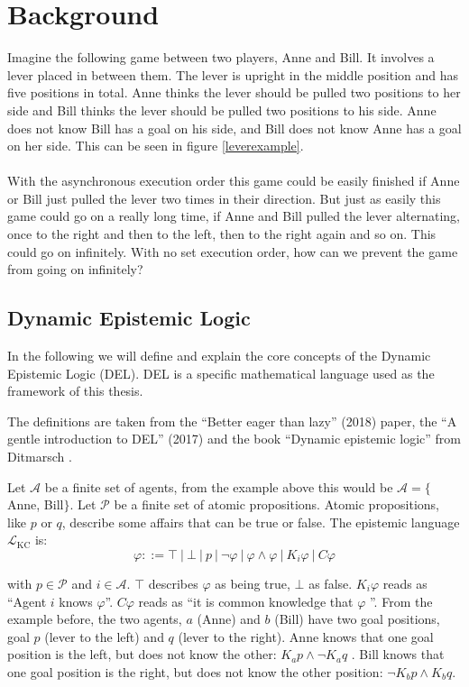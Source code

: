 \chapter{Background}\label{chap:background}

Imagine the following game between two players, Anne and Bill. It  involves a lever placed in between them. The lever is upright in the middle position and has five positions in total. Anne thinks the lever should be pulled two positions to her side and Bill thinks the lever should be pulled two positions to his side.
Anne does not know Bill has a goal on his side, and Bill does not know Anne has a goal on her side.
This can be seen in figure \ref{leverexample}.\\
 \\

With the asynchronous execution order this game could be easily finished if Anne or Bill just pulled the lever two times in their direction. But just as easily this game could go on a really long time, if Anne and Bill pulled the lever alternating, once to the right and then to the left, then to the right again and so on. This could go on infinitely. With no set execution order, how can we prevent the game from going on infinitely?

\section{Dynamic Epistemic Logic}
In the following we will define and explain the core concepts of the Dynamic Epistemic Logic (DEL). DEL is a specific mathematical language used as the framework of this thesis.

The definitions are taken from the ``Better eager than lazy'' (2018) \cite{bolander2018better} paper, the ``A gentle introduction to DEL'' (2017) \cite{bolander2017gentle} and the book ``Dynamic epistemic logic'' from Ditmarsch \cite{Ditmarsch2007}.

Let $\mathcal{A}$ be a finite set of agents, from the example above this would be $\mathcal{A} =\{$Anne, Bill$\}$. Let $\mathcal{P}$ be a finite set of atomic propositions. Atomic propositions, like $p$ or $q$, describe some affairs that can be true or false.
The epistemic language $\mathcal{L}_{\text{KC}}$ is: \\
$$
\varphi ::= \top \ | \ \bot \ | \ p \ | \ \neg \varphi \ | \ \varphi \wedge \varphi \ | \ K_i \varphi \ | \ C\varphi
$$

with $p \in \mathcal{P}$ and $i \in \mathcal{A}$.
$\top$ describes $\varphi$ as being true, $\bot$ as false.
$K_i \varphi$ reads as ``Agent $i$ knows $\varphi$''. $C \varphi$ reads as ``it is common knowledge that $\varphi$ ''.
From the example before, the two agents, $a$ (Anne) and $b$ (Bill) have two goal positions, goal $p$ (lever to the left) and $q$ (lever to the right). Anne knows that one goal position is the left, but does not know the other: $K_a p \wedge \neg K_a q$ . Bill knows that one goal position is the right, but does not know the other position: $\neg K_b  p \wedge K_b q$.


